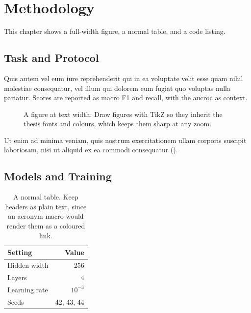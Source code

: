 \chapter{Methodology}
\label{chap:methodology}

This chapter shows a full-width figure, a normal table, and a code listing.

\section{Task and Protocol}
\label{sec:method-protocol}

Quis autem vel eum iure reprehenderit qui in ea voluptate velit esse quam nihil molestiae consequatur, vel illum qui dolorem eum fugiat quo voluptas nulla pariatur.
Scores are reported as macro F1 and recall, with the \ac{aucroc} as context.

\begin{figure}[htbp]
  \centering
  \caption[A figure in the text block]{A figure at text width. Draw figures with TikZ so they inherit the thesis fonts and colours, which keeps them sharp at any zoom.}
  \label{fig:method-pipeline}
\end{figure}

Ut enim ad minima veniam, quis nostrum exercitationem ullam corporis suscipit laboriosam, nisi ut aliquid ex ea commodi consequatur ().

\section{Models and Training}
\label{sec:method-models}

\begin{table}[htbp]
  \centering
  \caption[A table in the text block]{A normal table. Keep headers as plain text, since an acronym macro would render them as a coloured link.}
  \label{tab:method-config}
  \small
  \begin{tabular}{@{}lr@{}}
    \toprule
    Setting & Value \\
    \midrule
    Hidden width & 256 \\
    Layers & 4 \\
    Learning rate & $10^{-3}$ \\
    Seeds & 42, 43, 44 \\
    \bottomrule
  \end{tabular}
\end{table}

